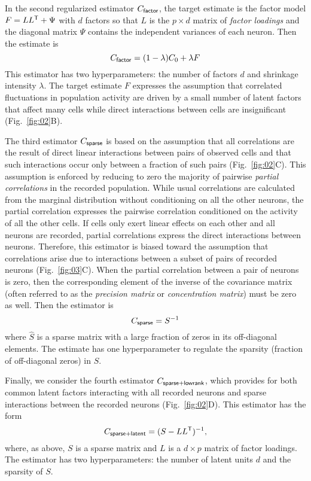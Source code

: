 \documentclass[10pt]{article}
\newcommand{\T}{{\sf T}}
\begin{document}
In the second regularized estimator $C_{\sf factor}$, the target estimate is the factor model $F =  L L^\T + \Psi$ with $d$ factors so that $L$ is the $p\times d$ matrix of \emph{factor loadings} and the diagonal matrix $\Psi$ contains the independent variances of each neuron.
Then the estimate is 
\begin{equation}
C_{\sf factor} = (1-\lambda) C_0 + \lambda F
\end{equation}
This estimator has two hyperparameters: the number of factors $d$ and shrinkage intensity $\lambda$. The target estimate $F$ expresses the assumption that correlated fluctuations in population activity are driven by a small number of latent factors that affect many cells while direct interactions between cells are insignificant (Fig.~\ref{fig:02}\;B).   

The third estimator $C_{\sf sparse}$ is based on the assumption that all correlations are the result of direct linear interactions between pairs of observed cells and that such interactions occur only between a fraction of such pairs (Fig.~\ref{fig:02}\;C).
This assumption is enforced by reducing to zero the majority of pairwise \emph{partial correlations} in the recorded population. 
While usual correlations are calculated from the marginal distribution without conditioning on all the other neurons, the partial correlation expresses the pairwise correlation conditioned on the activity of all the other cells.  
If cells only exert linear effects on each other and all neurons are recorded, partial correlations express the direct interactions between neurons. 
Therefore, this estimator is biased toward the assumption that correlations arise due to interactions between a subset of pairs of recorded neurons (Fig.~\ref{fig:03}C). When the partial correlation between a pair of neurons is zero, then the corresponding element of the inverse of the covariance matrix (often referred to as the \emph{precision matrix} or \emph{concentration matrix}) must be zero as well. Then the estimator is 
\begin{equation}
C_{\sf sparse} = S^{-1}
\end{equation}
where $\hat S$ is a sparse matrix with a large fraction of zeros in its off-diagonal elements. The estimate has one hyperparameter to regulate the sparsity (fraction of off-diagonal zeros) in $S$.

Finally, we consider the fourth estimator $C_{\sf sparse+lowrank}$, which provides for both common latent factors interacting with all recorded neurons and sparse interactions between the recorded neurons (Fig.~\ref{fig:02}\;D). This estimator has the form
\begin{equation}
C_{\sf sparse+latent} = (S - LL^\T)^{-1},
\end{equation}
where, as above, $S$ is a sparse matrix and $L$ is a $d\times p$ matrix of factor loadings. The estimator has two hyperparameters: the number of latent units $d$ and the sparsity of $S$.
\end{document}

